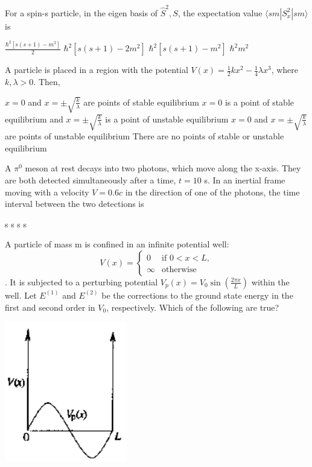 \documentclass{exam}
\begin{document}
\begin{questions}
\question For a spin-s particle, in the eigen basis of $\hat{S}^2,S$, the expectation value $\langle s m | S_x^2 | s m \rangle$ is\hfill{}

\begin{choices}
	\begin{multicols}{2}
	 \choice $\frac{\hbar^2[s(s+1)-m^2]}{2}$ \choice $\hbar^2[s(s+1)-2m^2]$
	\choice $\hbar^2[s(s+1)-m^2]$ \choice $\hbar^2 m^2$
	\end{multicols}
\end{choices}

\question A particle is placed in a region with the potential $V(x)=\frac{1}{2}kx^2-\frac{1}{4}\lambda x^3$, where $k, \lambda > 0$. Then,\hfill{}

\begin{choices}
	\choice $x=0$ and $x=\pm\sqrt{\frac{k}{\lambda}}$ are points of stable equilibrium
	\choice $x=0$ is a point of stable equilibrium and $x=\pm\sqrt{\frac{k}{\lambda}}$ is a point of unstable equilibrium
	\choice $x=0$ and $x=\pm\sqrt{\frac{k}{\lambda}}$ are points of unstable equilibrium
	\choice There are no points of stable or unstable equilibrium
\end{choices}

\question A $\pi^0$ meson at rest decays into two photons, which move along the x-axis. They are both detected simultaneously after a time, $t=10$ s. In an inertial frame moving with a velocity $V=0.6c$ in the direction of one of the photons, the time interval between the two detections is\hfill{}

\begin{oneparchoices}
	 s  s  s  s
\end{oneparchoices}

\question A particle of mass m is confined in an infinite potential well: $$V(x) = \begin{cases} 0 & \text{if } 0<x<L, \\ \infty & \text{otherwise} \end{cases}$$. It is subjected to a perturbing potential $V_p(x) = V_0 \sin\left(\frac{2\pi x}{L}\right)$ within the well. Let $E^{(1)}$ and $E^{(2)}$ be the corrections to the ground state energy in the first and second order in $V_0$, respectively. Which of the following are true?\hfill{}
	\begin{center}
		\includegraphics[width=0.4\textwidth]{pics/47.png}
	\end{center}



\end{questions}
\end{document}
